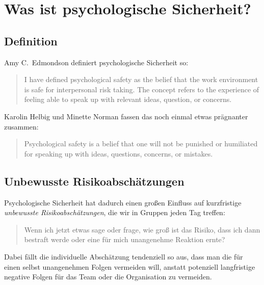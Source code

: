 \section{Was ist psychologische Sicherheit?}

\subsection{Definition}
\label{ps-definition}

Amy C.~Edmondson \cite{the-fearless-organisation} definiert psychologische Sicherheit so:

\begin{quote}
  I have defined psychological safety as the belief that the work environment is safe for interpersonal risk taking. The concept refers to the experience of feeling able to speak up with relevant ideas, question, or concerns.
\end{quote}

Karolin Helbig und Minette Norman \cite{psychological-safety-playbook} fassen das noch einmal etwas prägnanter zusammen:

\begin{quote}
  Psychological safety is a belief that one will not be punished or humiliated for speaking up with ideas, questions, concerns, or mistakes.
\end{quote}


\subsection{Unbewusste Risikoabschätzungen}

Psychologische Sicherheit hat dadurch einen großen Einfluss auf kurzfristige \emph{unbewusste Risikoabschätzungen}, die wir in Gruppen jeden Tag treffen:

\begin{quote}
  \glqq Wenn ich jetzt etwas sage oder frage, wie groß ist das Risiko, dass ich dann bestraft werde oder eine für mich unangenehme Reaktion ernte?\grqq
\end{quote}

Dabei fällt die individuelle Abschätzung tendenziell so aus, dass man die für einen selbst unangenehmen Folgen vermeiden will, anstatt potenziell langfristige negative Folgen für das Team oder die Organisation zu vermeiden.


